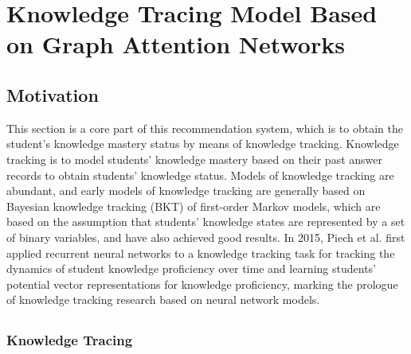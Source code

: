 \chapter{Knowledge Tracing Model Based on Graph Attention Networks}

\ifpdf
    \graphicspath{{Chapter3/Figs/Raster/}{Chapter3/Figs/PDF/}{Chapter3/Figs/}}
\else
    \graphicspath{{Chapter3/Figs/Vector/}{Chapter3/Figs/}}
\fi

\section{Motivation}


This section is a core part of this recommendation system, which is to obtain the student's knowledge mastery status by means of knowledge tracking. Knowledge tracking is to model students' knowledge mastery based on their past answer records to obtain students' knowledge status. Models of knowledge tracking are abundant, and early models of knowledge tracking are generally based on Bayesian knowledge tracking (BKT) of first-order Markov models, which are based on the assumption that students' knowledge states are represented by a set of binary variables, and have also achieved good results. In 2015, Piech et al.\cite{piech2015deep} first applied recurrent neural networks to a knowledge tracking task for tracking the dynamics of student knowledge proficiency over time and learning students' potential vector representations for knowledge proficiency, marking the prologue of knowledge tracking research based on neural network models.

%

\section{}

\subsection{Knowledge Tracing}

